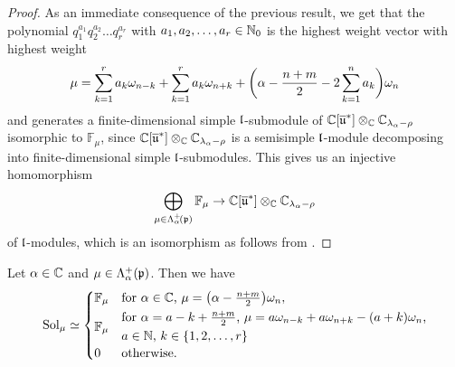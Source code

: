 \begin{proof}
As an immediate consequence of the previous result, we get that the polynomial $q_1^{a_1}q_2^{a_2}\dots q_r^{a_r}$ with $a_1,a_2,\dots,a_r \in \mathbb{N}_0$ is the highest weight vector with highest weight
\begin{align*}
\mu=\sum_{k=1}^r a_k \omega_{n-k} + \sum_{k=1}^r a_k \omega_{n+k} + \bigg(\alpha - {n+m \over 2} - 2\sum_{k=1}^n a_k\bigg) \omega_n
\end{align*}
and generates a finite-dimensional simple $\mathfrak{l}$-submodule of $\mathbb{C}[\overline{\mathfrak{u}}^*] \otimes_{\mathbb{C}} \mathbb{C}_{\lambda_\alpha-\rho}$ isomorphic to $\mathbb{F}_\mu$, since $\mathbb{C}[\overline{\mathfrak{u}}^*] \otimes_{\mathbb{C}} \mathbb{C}_{\lambda_\alpha-\rho}$ is a semisimple $\mathfrak{l}$-module decomposing into finite-dimensional simple $\mathfrak{l}$-submodules. This gives us an injective homomorphism
\begin{align*}
  \bigoplus_{\mu \in \Lambda^+_\alpha\!(\mathfrak{p})} \mathbb{F}_\mu \rightarrow \mathbb{C}[\overline{\mathfrak{u}}^*] \otimes_{\mathbb{C}} \mathbb{C}_{\lambda_\alpha-\rho}
\end{align*}
of $\mathfrak{l}$-modules, which is an isomorphism as follows from \cite{goodman_symmetry_2009}.
\end{proof}

\begin{lemma}\label{lem:solution space AGS}
Let $\alpha \in \mathbb{C}$ and $\mu \in \Lambda^+_\alpha(\mathfrak{p})$. Then we have
\begin{align*}
 \Sol_\mu \simeq
 \begin{cases}
   \mathbb{F}_\mu & \text{for $\alpha \in \C$, $\mu = \big(\alpha-{n+m \over 2}\big)\omega_n$}, \\[1mm]
   \mathbb{F}_\mu & \text{$\!\begin{gathered}\text{for $\alpha = a-k+{\textstyle {n+m \over 2}}$, $\mu=a \omega_{n-k} + a\omega_{n+k}-(a+k)\omega_n$,}\\[1mm] \text{$a \in \N$, $k \in \{1,2,\dots,r\}$} \hfill \end{gathered}$} \\[1mm]
   0 & \text{otherwise}.
 \end{cases}
\end{align*}
\end{lemma}

